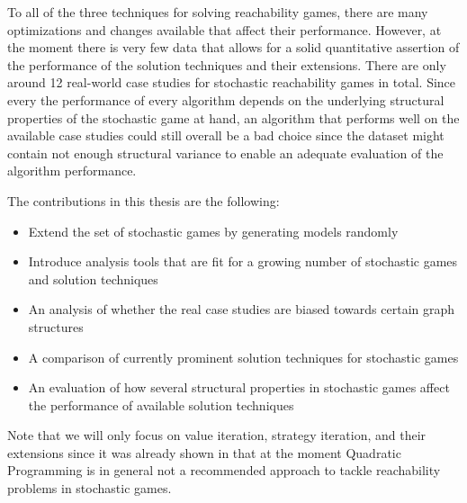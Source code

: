 To all of the three techniques for solving reachability games, there are many optimizations and changes available that affect their performance.
However, at the moment there is very few data that allows for a solid quantitative assertion of the performance of the solution techniques and their extensions.
There are only around 12 real-world case studies for stochastic reachability games in total.
Since every the performance of every algorithm depends on the underlying structural properties of the stochastic game at hand, 
an algorithm that performs well on the available case studies could still overall be a bad choice since the dataset might contain not enough
structural variance to enable an adequate evaluation of the algorithm performance.

The contributions in this thesis are the following:
\begin{itemize}
    \item Extend the set of stochastic games by generating models randomly
    \item Introduce analysis tools that are fit for a growing number of stochastic games and solution techniques
    \item An analysis of whether the real case studies are biased towards certain graph structures
    \item A comparison of currently prominent solution techniques for stochastic games
    \item An evaluation of how several structural properties in stochastic games affect the performance of available solution techniques
\end{itemize}

Note that we will only focus on value iteration, strategy iteration, and their extensions since it was already shown in \cite{Gandalf} that at the moment
Quadratic Programming is in general not a recommended approach to tackle reachability problems in stochastic games.


